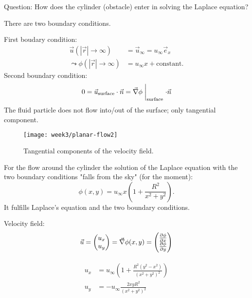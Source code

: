 Question: How does the cylinder (obstacle) enter in solving the Laplace equation?

There are two boundary conditions.

First boudary condition:
\begin{align}
\vec{u}(|\vec{r}|\rightarrow\infty) &= \vec{u}_\infty = u_\infty\vec{e}_x \\
\leadsto
\phi(|\vec{r}|\rightarrow\infty) &= u_\infty x + \mathrm{constant.}
\end{align}
Second boundary condition:
\begin{equation}
0=\vec{u}_\mathrm{surface}\cdot \vec{n} = \vec{\nabla}\phi\biggm\vert_\mathrm{surface}\cdot\vec{n}
\end{equation}
The fluid particle does not flow into/out of the surface; only tangential component.

\begin{figure}[!h]
    \centering
    \texttt{[image: week3/planar-flow2]}
    \caption{Tangential components of the velocity field.}
    \label{fig:planar-flow2}
\end{figure}

For the flow around the cylinder the solution of the Laplace equation with the two boundary conditions "falls from the sky" (for the moment):
\begin{equation}\label{eq:cylinder-flow}
\phi(x,y)=u_\infty x\left(1+\frac{R^2}{x^2+y^2}\right).
\end{equation}
It fulfills Laplace's equation and the two boundary conditions.

Velocity field:
\begin{equation}
\vec{u} = \begin{pmatrix}
u_x\\u_y
\end{pmatrix}  =
\vec{\nabla}\phi(x,y) = \begin{pmatrix}
\frac{\partial \phi}{\partial x} \\
\frac{\partial \phi}{\partial y}
\end{pmatrix}
\end{equation}

\begin{align}
\begin{split}\label{eq:uxuy1}
u_x &= u_\infty\left(1+\frac{R^2(y^2-x^2)}{(x^2+y^2)^2}\right)\\
u_y &= -u_\infty \frac{2xyR^2}{(x^2+y^2)^2}
\end{split}
\end{align}

